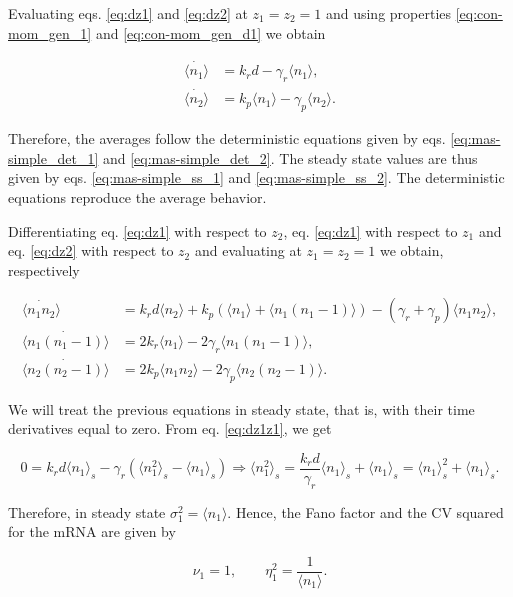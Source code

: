 Evaluating eqs. \eqref{eq:dz1} and \eqref{eq:dz2} at $z_1 = z_2 = 1$ and using properties \eqref{eq:con-mom_gen_1} and \eqref{eq:con-mom_gen_d1} we obtain

\begin{align*}
\dot{\langle n_1 \rangle}&= k_rd - \gamma_r \langle n_1 \rangle,\\
\dot{\langle n_2 \rangle}&= k_p\langle n_1 \rangle - \gamma_p \langle n_2 \rangle.
\end{align*}

Therefore, the averages follow the deterministic equations given by eqs. \eqref{eq:mas-simple_det_1} and \eqref{eq:mas-simple_det_2}. The steady state values are thus given by eqs. \eqref{eq:mas-simple_ss_1} and \eqref{eq:mas-simple_ss_2}. The deterministic equations reproduce the average behavior. 

Differentiating eq. \eqref{eq:dz1} with respect to $z_2$, eq. \eqref{eq:dz1} with respect to $z_1$ and eq. \eqref{eq:dz2} with respect to $z_2$ and evaluating at $z_1 = z_2 = 1$ we obtain, respectively

\begin{align}
  \dot{\langle n_1n_2\rangle} &= k_rd\langle n_2 \rangle + k_p\left(\langle n_1\rangle + \langle n_1(n_1-1) \rangle \right) - \left( \gamma_r + \gamma_p \right)\langle n_1n_2 \rangle,\label{eq:dz1z2}\\
  \dot{\langle n_1(n_1-1)\rangle} &= 2k_r\langle n_1\rangle-2\gamma_r\langle n_1(n_1-1) \rangle, \label{eq:dz1z1}\\
  \dot{\langle n_2(n_2-1)\rangle} &= 2k_p\langle n_1n_2 \rangle - 2\gamma_p\langle n_2(n_2-1)\rangle. \label{eq:dz2z2}
\end{align}

We will treat the previous equations in steady state, that is, with their time derivatives equal to zero. From  eq. \eqref{eq:dz1z1}, we get

\begin{equation}
  \label{eq:pren1}
  0 = k_rd \langle n_1 \rangle_s -\gamma_r \left(\langle n_1^2 \rangle_s - \langle n_1 \rangle_s \right) \Rightarrow \langle n_1^2 \rangle_s = \frac{k_rd}{\gamma_r}\langle n_1 \rangle_s + \langle n_1 \rangle_s = \langle n_1 \rangle_s^2 + \langle n_1 \rangle_s.
\end{equation}

Therefore, in steady state $\sigma_1^2 = \langle n_1 \rangle$. Hence, the Fano factor and the CV squared for the mRNA are given by

\begin{equation}
  \label{noise1}
  \boxed{\nu_1 = 1}, \quad\quad \boxed{\eta_1^2 = \frac{1}{\langle n_1 \rangle}}.
\end{equation}

